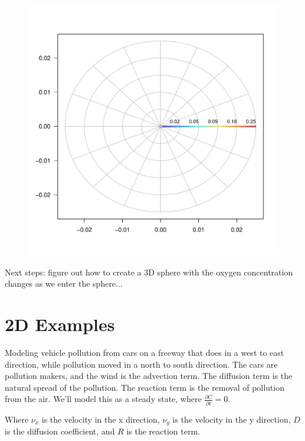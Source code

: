 \documentclass{tufte-handout}\usepackage[]{graphicx}\usepackage[]{xcolor}
\makeatletter
\def\maxwidth{ %
  \ifdim\Gin@nat@width>\linewidth
    \linewidth
  \else
    \Gin@nat@width
  \fi
}
\newenvironment{knitrout}{}{} %
\makeatother
\begin{document}
\begin{figure}
\begin{knitrout}
\color{fgcolor}
\includegraphics[width=\maxwidth]{figure/circleplot-1} 
\end{knitrout}
\end{figure}

Next steps: figure out how to create a 3D sphere with the oxygen concentration changes as we enter the sphere... 






\section{2D Examples}

Modeling vehicle pollution from cars on a freeway that does in a west to east direction, while pollution moved in a north to south direction. The cars are pollution makers, and the wind is the advection term. The diffusion term is the natural spread of the pollution. The reaction term is the removal of pollution from the air. We'll model this as a steady state, where $\frac{\partial C}{\partial t} = 0$.





Where $\nu_x$  is the velocity in the x direction, $\nu_y$ is the velocity in the y direction, $D$ is the diffusion coefficient, and $R$ is the reaction term.
\end{document}
